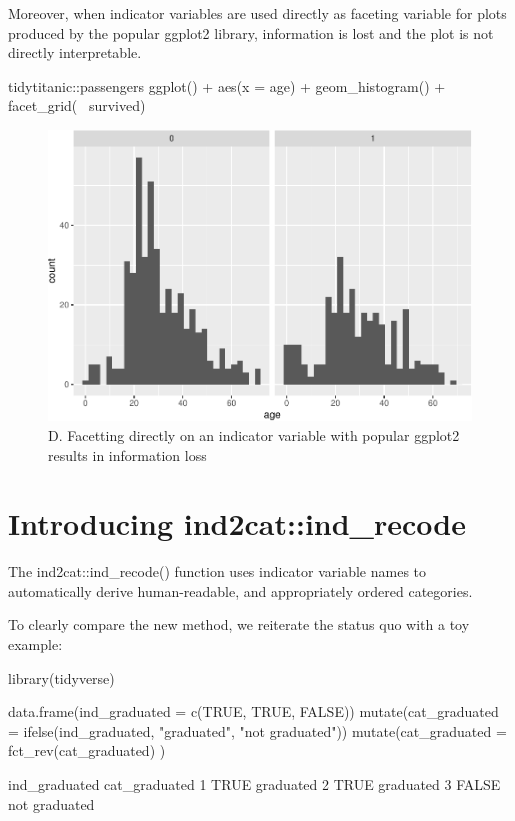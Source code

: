 Moreover, when indicator variables are used directly as faceting
variable for plots produced by the popular ggplot2 library, information
is lost and the plot is not directly interpretable.

\begin{Schunk}
\begin{Sinput}
tidytitanic::passengers %
ggplot() + 
  aes(x = age) + 
  geom_histogram() + 
  facet_grid(~ survived)
\end{Sinput}
\begin{figure}
\includegraphics[width=0.69\linewidth]{r_journal_files/figure-latex/direct_visual_loss-1} \caption[D]{D. Facetting directly on an indicator variable with popular ggplot2 results in information loss}\label{fig:direct_visual_loss}
\end{figure}
\end{Schunk}

\hypertarget{introducing-ind2catind_recode}{%
\section{Introducing
ind2cat::ind\_recode}\label{introducing-ind2catind_recode}}

The ind2cat::ind\_recode() function uses indicator variable names to
automatically derive human-readable, and appropriately ordered
categories.

To clearly compare the new method, we reiterate the status quo with a
toy example:

\begin{Schunk}
\begin{Sinput}
library(tidyverse)

data.frame(ind_graduated = 
             c(TRUE, TRUE, FALSE))  %
  mutate(cat_graduated  = 
           ifelse(ind_graduated, 
                  "graduated", 
                  "not graduated"))  %
  mutate(cat_graduated = 
           fct_rev(cat_graduated)
         )  
\end{Sinput}
\begin{Soutput}
       ind_graduated cat_graduated
     1          TRUE     graduated
     2          TRUE     graduated
     3         FALSE not graduated
\end{Soutput}
\end{Schunk}

